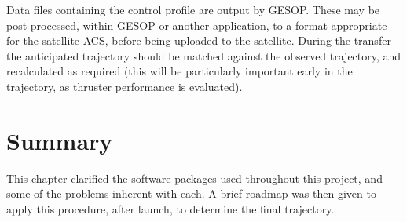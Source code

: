 Data files containing the control profile are output by GESOP. These may be post-processed, within GESOP or another application, to a format appropriate for the satellite ACS, before being uploaded to the satellite. During the transfer the anticipated trajectory should be matched against the observed trajectory, and recalculated as required (this will be particularly important early in the trajectory, as thruster performance is evaluated).

\section{Summary} \label{sec:Method-summary}

This chapter clarified the software packages used throughout this project, and some of the problems inherent with each. A brief roadmap was then given to apply this procedure, after launch, to determine the final trajectory.

  
\clearpage